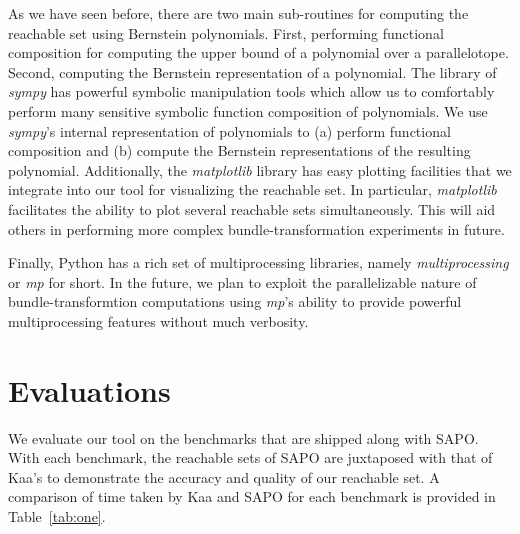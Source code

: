 \documentclass[EPiC]{easychair}
\begin{document}
%
As we have seen before, there are two main sub-routines for computing the reachable set using Bernstein polynomials.
%
First, performing functional composition for computing the upper bound of a polynomial over a parallelotope.
%
Second, computing the Bernstein representation of a polynomial.
%
The library of \emph{sympy} has powerful symbolic manipulation tools which allow us to comfortably perform many sensitive symbolic function composition of polynomials. 
%
We use \emph{sympy}'s internal representation of polynomials to (a) perform functional composition and (b) compute the Bernstein representations of the resulting polynomial.
%
Additionally, the \emph{matplotlib} library has easy plotting facilities that we integrate into our tool for visualizing the reachable set. In particular, \emph{matplotlib} facilitates the ability to plot several reachable sets simultaneously. This will aid others in performing more complex bundle-transformation experiments in future. 

%
Finally, Python has a rich set of multiprocessing libraries, namely \emph{multiprocessing} or \emph{mp} for short. In the future, we plan to exploit the parallelizable nature of bundle-transformtion computations using \emph{mp}'s ability to provide powerful multiprocessing features without much verbosity.






\section{Evaluations}
We evaluate our tool on the benchmarks that are shipped along with SAPO. With each benchmark, the reachable sets of SAPO are juxtaposed with that of Kaa's to demonstrate the accuracy and quality of our reachable set. A comparison of time taken by Kaa and SAPO for each benchmark is provided in Table~\ref{tab:one}.
\end{document}
